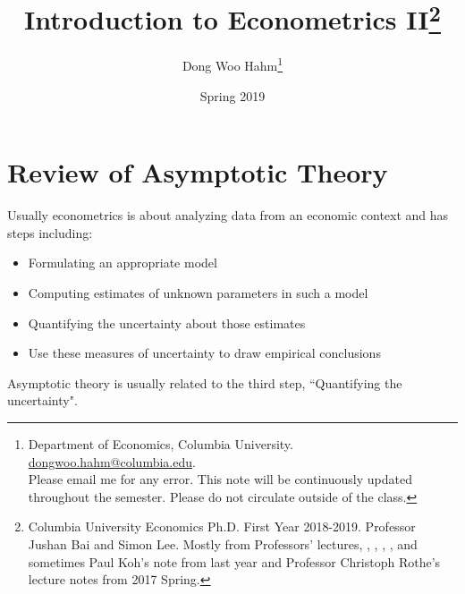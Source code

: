 \documentclass[11pt]{article} %
\title{Introduction to Econometrics II\thanks{Columbia University Economics Ph.D. First Year 2018-2019. Professor Jushan Bai and Simon Lee. Mostly from Professors' lectures, \cite{hanseneconometrics}, \cite{cameronandtrivedi}, \cite{mostlyharmless}, \cite{wooldridgepanel},  and sometimes Paul Koh's note from last year and Professor Christoph Rothe's lecture notes from 2017 Spring.}}
\author{Dong Woo Hahm\thanks{Department of Economics, Columbia University. \href{mailto:dongwoo.hahm@columbia.edu}{dongwoo.hahm@columbia.edu}. \\Please email me for any error. This note will be continuously updated throughout the semester. Please do not circulate outside of the class.}}
\date{Spring 2019} %
\theoremstyle{definition}
\numberwithin{defn}{subsection}
\numberwithin{thm}{subsection}
\numberwithin{ex}{subsection}
\begin{document}
\maketitle
\tableofcontents
\clearpage
\section{Review of Asymptotic Theory}
\noindent Usually econometrics is about analyzing data from an economic context and has steps including:
\begin{itemize}
\item Formulating an appropriate model
\item Computing estimates of unknown parameters in such a model
\item Quantifying the uncertainty about those estimates
\item Use these measures of uncertainty to draw empirical conclusions
\end{itemize}
Asymptotic theory is usually related to the third step, ``Quantifying the uncertainty".
\end{document}
